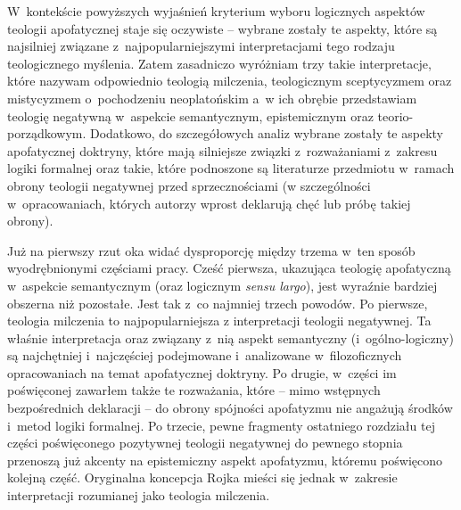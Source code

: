 W~kontekście powyższych wyjaśnień kryterium wyboru logicznych aspektów teologii apofatycznej staje się oczywiste -- wybrane zostały te aspekty, które są najsilniej związane z~najpopularniejszymi interpretacjami tego rodzaju teologicznego myślenia. Zatem zasadniczo wyróżniam trzy takie interpretacje, które nazywam odpowiednio teologią milczenia, teologicznym sceptycyzmem oraz mistycyzmem o~pochodzeniu neoplatońskim a~w ich obrębie przedstawiam teologię negatywną w~aspekcie semantycznym, epistemicznym oraz teorio-porządkowym. Dodatkowo, do szczegółowych analiz wybrane zostały te aspekty apofatycznej doktryny, które mają silniejsze związki z~rozważaniami z~zakresu logiki formalnej oraz takie, które podnoszone są literaturze przedmiotu w~ramach obrony teologii negatywnej przed sprzecznościami (w szczególności w~opracowaniach, których autorzy wprost deklarują chęć lub próbę takiej obrony).

Już na pierwszy rzut oka widać dysproporcję między trzema w~ten sposób wyodrębnionymi częściami pracy. Cześć pierwsza, ukazująca teologię apofatyczną w~aspekcie semantycznym (oraz logicznym \textit{sensu largo}), jest wyraźnie bardziej obszerna niż pozostałe. Jest tak z~co najmniej trzech powodów. Po pierwsze,
teologia milczenia to najpopularniejsza z interpretacji teologii negatywnej.
Ta właśnie interpretacja oraz związany z~nią aspekt semantyczny (i~ogólno-logiczny) są najchętniej i~najczęściej podejmowane i~analizowane w~filozoficznych opracowaniach na temat apofatycznej doktryny. Po drugie, w~części im poświęconej zawarłem także te rozważania, które -- mimo wstępnych bezpośrednich deklaracji -- do obrony spójności apofatyzmu nie angażują środków i~metod logiki formalnej. Po trzecie, pewne fragmenty ostatniego rozdziału tej części poświęconego pozytywnej teologii negatywnej do pewnego stopnia przenoszą już akcenty na epistemiczny aspekt apofatyzmu, któremu poświęcono kolejną część. Oryginalna koncepcja Rojka mieści się jednak w~zakresie interpretacji rozumianej jako teologia milczenia.

